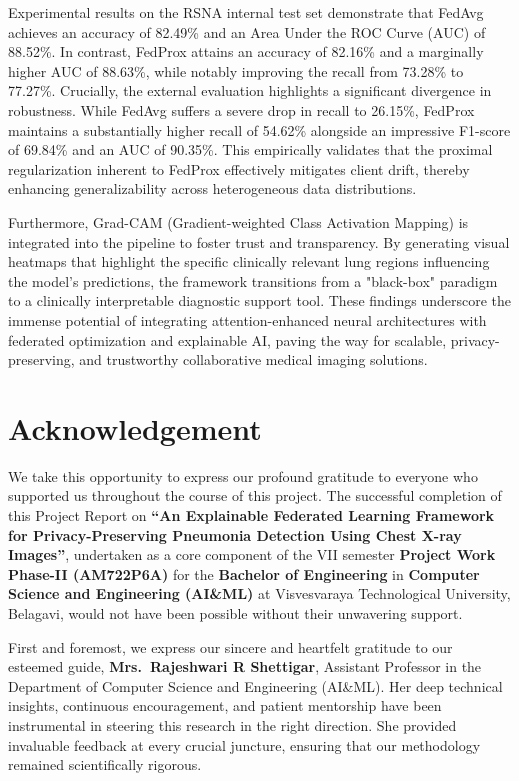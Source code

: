 \documentclass[12pt,a4paper]{report}
\newcommand{\projecttitle}{An Explainable Federated Learning Framework for Privacy-Preserving Pneumonia Detection Using Chest X-ray Images}
\newcommand{\guide}{Mrs.\ Rajeshwari R Shettigar}
\begin{document}
Experimental results on the RSNA internal test set demonstrate that FedAvg achieves an accuracy of 82.49\% and an Area Under the ROC Curve (AUC) of 88.52\%. In contrast, FedProx attains an accuracy of 82.16\% and a marginally higher AUC of 88.63\%, while notably improving the recall from 73.28\% to 77.27\%. Crucially, the external evaluation highlights a significant divergence in robustness. While FedAvg suffers a severe drop in recall to 26.15\%, FedProx maintains a substantially higher recall of 54.62\% alongside an impressive F1-score of 69.84\% and an AUC of 90.35\%. This empirically validates that the proximal regularization inherent to FedProx effectively mitigates client drift, thereby enhancing generalizability across heterogeneous data distributions.

Furthermore, Grad-CAM (Gradient-weighted Class Activation Mapping) is integrated into the pipeline to foster trust and transparency. By generating visual heatmaps that highlight the specific clinically relevant lung regions influencing the model's predictions, the framework transitions from a "black-box" paradigm to a clinically interpretable diagnostic support tool. These findings underscore the immense potential of integrating attention-enhanced neural architectures with federated optimization and explainable AI, paving the way for scalable, privacy-preserving, and trustworthy collaborative medical imaging solutions.

\chapter*{Acknowledgement}

We take this opportunity to express our profound gratitude to everyone who supported us throughout the course of this project. The successful completion of this Project Report on \textbf{``\projecttitle''}, undertaken as a core component of the VII semester \textbf{Project Work Phase-II (AM722P6A)} for the \textbf{Bachelor of Engineering} in \textbf{Computer Science and Engineering (AI\&ML)} at Visvesvaraya Technological University, Belagavi, would not have been possible without their unwavering support.

\par
\vspace{0.15in}
\noindent
First and foremost, we express our sincere and heartfelt gratitude to our esteemed guide, \textbf{\guide}, Assistant Professor in the Department of Computer Science and Engineering (AI\&ML). Her deep technical insights, continuous encouragement, and patient mentorship have been instrumental in steering this research in the right direction. She provided invaluable feedback at every crucial juncture, ensuring that our methodology remained scientifically rigorous.
\end{document}
